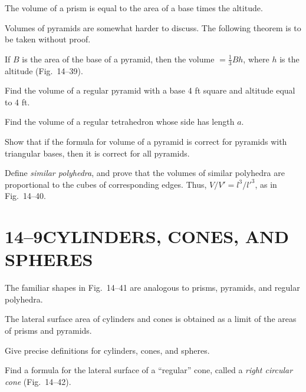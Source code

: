 \documentclass[11pt]{book}
\theoremstyle{bkplain}
\theoremstyle{XIplainnote}
\theoremstyle{bkplain}
\theoremstyle{bkplain}
\begin{document}
\begin{theorem}
The volume of a prism is equal to the area of a base times the altitude.
\end{theorem}

Volumes of pyramids are somewhat harder to discuss. The following theorem is to
be taken without proof.

\begin{theorem}
If $B$ is the area of the base of a pyramid, then the volume $=
\frac{1}{3}Bh$, where $h$ is the altitude (Fig.~14--39).
\end{theorem}

\FIGXIVTHIRTYNINE

\begin{exercisecols}
\begin{exlist}
\item Find the volume of a regular pyramid with a base 4 ft square and altitude
      equal to 4 ft.
\item Find the volume of a regular tetrahedron whose side has length $a$.
\item Show that if the formula for volume of a pyramid is correct for pyramids
      with triangular bases, then it is correct for all pyramids.
\item Define \emph{similar polyhedra}, and prove that the volumes of similar
      polyhedra are proportional to the cubes of corresponding edges. Thus,
      $V/V' = l^3/l'^3$, as in Fig.~14--40.
\exfig{\FIGXIVFORTY}
\end{exlist}
\end{exercisecols}

\section*{14--9\quad CYLINDERS, CONES, AND SPHERES}

The familiar shapes in Fig.~14--41 are analogous to prisms, pyramids, and
regular polyhedra.

The lateral surface area of cylinders and cones is obtained as a limit of the
areas of prisms and pyramids.

\FIGXIVFORTYONE

\begin{exercisecols}
\begin{exlist}
\item Give precise definitions for cylinders, cones, and spheres.
\item Find a formula for the lateral surface of a ``regular'' cone, called a
      \emph{right circular cone} (Fig.~14--42).
\exfig{\FIGXIVFORTYTWO}
\end{exlist}
\end{exercisecols}
\end{document}
